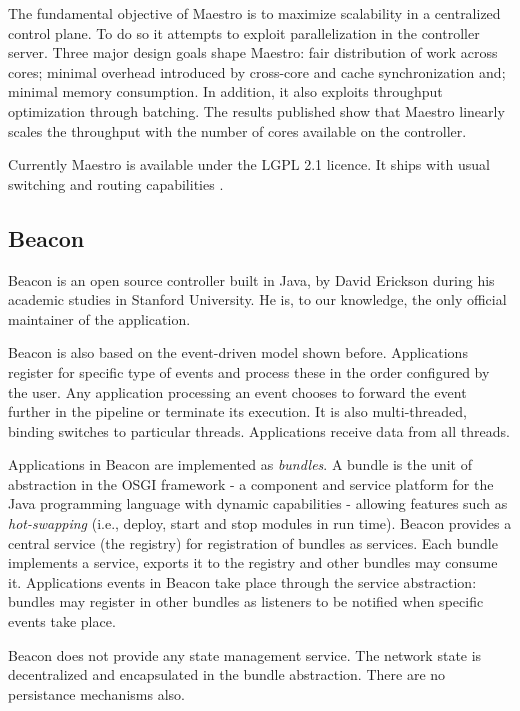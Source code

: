 The fundamental objective of Maestro is to maximize scalability in a centralized control plane. To do so it attempts to exploit parallelization in the controller server.  Three major design goals shape Maestro: fair distribution of work across cores; minimal overhead introduced by cross-core and cache synchronization and;
minimal memory consumption. In addition, it also
exploits throughput optimization through batching. 
The results published show that Maestro linearly scales the throughput with the number of cores available on the controller. 

Currently Maestro is available under the LGPL 2.1 licence. It ships with usual switching  and routing capabilities \cite{maestro}.


\subsection{Beacon}
\label{sec:related:beacon}


Beacon is an open source controller built in Java, by David Erickson during his academic studies in Stanford University. 
He is, to our knowledge, the only official maintainer of the
application. 

Beacon is also based on the event-driven model shown before. Applications register for
specific type of events and process these  in the order
configured by the user. Any application processing an event chooses to forward the
event further in the pipeline or terminate its execution. It is also
multi-threaded, binding switches to particular threads.
Applications receive data from all threads.

Applications in Beacon are implemented as \emph{bundles}. 
A bundle is the unit of abstraction in the OSGI \cite{osgi} framework - a component and service platform for the Java programming language with dynamic capabilities - allowing features such as \emph{hot-swapping} (i.e., deploy, start and stop modules in run time). 
Beacon provides a central service (the registry) for registration of bundles as services. 
Each bundle implements a service, exports it to the registry and other bundles may consume it. 
Applications events in Beacon take place through the service abstraction: bundles may register in other bundles as listeners to be notified when specific events take place. 

Beacon does not provide any state management service. The network state is decentralized and encapsulated in the bundle abstraction. There are no persistance  mechanisms also. 

